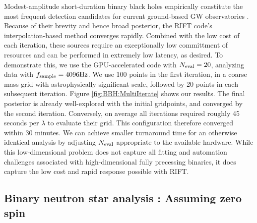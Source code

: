 \documentclass[twocolumn,prd,nofootinbib]{revtex4}
\newcommand\unit[1]{{\rm #1}}
\begin{document}
Modest-amplitude short-duration binary black holes empirically constitute the most frequent detection candidates
for current ground-based GW observatories \cite{LIGO-O2-Catalog}.    Because of their brevity and hence broad posterior,
the RIFT code's interpolation-based method converges  rapidly.  Combined with the low cost of each iteration,
these sources require an exceptionally low committment of resources and can be performed in extremely low latency, as
desired.
To demonstrate this, we use the GPU-accelerated code with $N_{\rm eval}=20$, analyzing data with $f_{\rm
  sample}=4096\unit{Hz}$.    We use 100 points in the first iteration, in a coarse mass  grid with astrophysically significant
scale, followed by 20 points in each subsequent iteration.  Figure \ref{fig:BBH:MultiIterate} shows our results.   The
final posterior is already well-explored with the initial gridpoints, and converged by the second iteration.  
Conversely, on average all iterations required roughly 45 seconds per $\lambda$ to evaluate their grid.  This
configuration therefore converged within 30 minutes.    We can achieve  smaller turnaround time for an otherwise identical analysis by adjusting $N_{\rm eval}$ appropriate to the available hardware.
%
While this low-dimensional problem does not capture all  fitting and automation challenges associated with high-dimensional
 fully precessing binaries, it does capture the low cost and rapid response possible with RIFT.






\subsection{Binary neutron star analysis : Assuming  zero spin}
\label{sec:sub:BNSFull}
\end{document}
